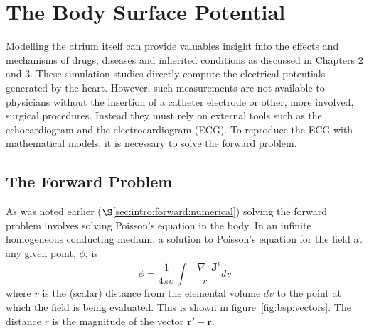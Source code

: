 \chapter{The Body Surface Potential}


Modelling the atrium itself can provide valuables insight into the effects and
mechanisms of drugs, diseases and inherited conditions as discussed in Chapters 2 and 3.
These simulation studies directly compute the electrical potentials generated by the heart.
However, such measurements are not available to physicians without the
insertion of a catheter electrode or other, more involved, surgical procedures.
Instead they must rely on external tools such as the echocardiogram and the
electrocardiogram (ECG).
To reproduce the ECG with mathematical models, it is necessary to solve the forward problem.

\section{The Forward Problem}

As was noted earlier ($\S$\ref{sec:intro:forward:numerical}) solving the forward
problem involves solving Poisson's equation in the body.
In an infinite homogeneous conducting medium, a solution to Poisson's equation
for the field at any given point, $\phi$, is~\cite{Plonsey1989}
\begin{equation}
\label{eqn:bsp:infinite}
\phi = \frac{1}{4 \pi \sigma} \int \frac{- \nabla \cdot
\mathbf{J}^{i} }{r} dv
\end{equation}
where $r$ is the (scalar) distance from the elemental volume $dv$ to the point at
which the field is being evaluated.
This is shown in figure~\ref{fig:bsp:vectors}.
The distance $r$ is the magnitude of the vector $\mathbf{r'}-\mathbf{r}$.


